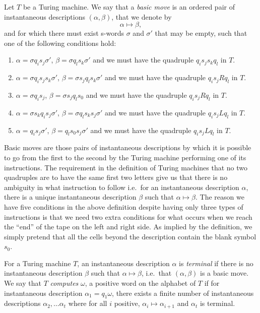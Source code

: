 \begin{definition}
  Let $T$ be a Turing machine. We say that a \emph{basic move} is an ordered pair of instantaneous descriptions $(\alpha,\beta)$, that we denote by
  \begin{equation*}
    \alpha \mapsto \beta,
  \end{equation*}
  and for which there must exist s-words $\sigma$ and $\sigma'$ that may be empty, such that one of the following conditions hold:
  \begin{enumerate}
  \item $\alpha = \sigma q_i s_j\sigma'$, $\beta = \sigma q_l s_k \sigma'$ and we must have the quadruple $q_is_js_kq_l$ in $T$.
  \item $\alpha = \sigma q_i s_j s_k \sigma'$, $\beta = \sigma s_j q_l s_k \sigma'$ and we must have the quadruple $q_is_jRq_l$ in $T$.
  \item $\alpha = \sigma q_i s_j$, $\beta = \sigma s_j q_l s_0$ and we must have the quadruple $q_is_jRq_l$ in $T$.
  \item $\alpha = \sigma s_k q_i s_j \sigma'$, $\beta = \sigma q_l s_k s_j \sigma'$ and we must have the quadruple $q_is_jLq_l$ in $T$.
  \item $\alpha = q_i s_j \sigma'$, $\beta =  q_l s_0 s_j \sigma'$ and we must have the quadruple $q_is_jLq_l$ in $T$.
  \end{enumerate}
\end{definition}

Basic moves are those pairs of instantaneous descriptions by which it is possible to go from the first to the second by the Turing machine performing one of its instructions. The requirement in the definition of Turing machines that no two quadruples are to have the same first two letters give us that there is no ambiguity in what instruction to follow i.e.\ for an instantaneous description $\alpha$, there is a unique instantaneous description $\beta$ such that $\alpha \mapsto \beta$. The reason we have five conditions in the above definition despite having only three types of instructions is that we need two extra conditions for what occurs when we reach the ``end'' of the tape on the left and right side. As implied by the definition, we simply pretend that all the cells beyond the description contain the blank symbol $s_0$.

\begin{definition}
For a Turing machine $T$, an instantaneous description $\alpha$ is \emph{terminal} if there is no instantaneous description $\beta$ such that $\alpha \mapsto \beta$, i.e.\ that $(\alpha,\beta)$ is a basic move. We say that $T$ \emph{computes} $\omega$, a positive word on the alphabet of $T$ if for instantaneous description $\alpha_1 = q_1\omega$, there exists a finite number of instantaneous descriptions $\alpha_2,\dots \alpha_t$ where for all $i$ positive, $\alpha_i \mapsto \alpha_{i+1}$ and $\alpha_t$ is terminal.
\end{definition}

